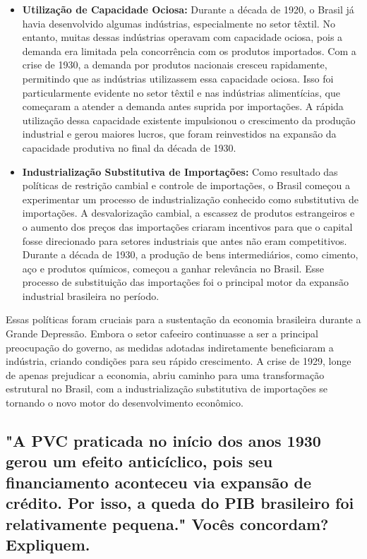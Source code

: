 \documentclass[a4paper,12pt]{article}[abntex2]
\begin{document}
\begin{itemize}
    \item \textbf{Utilização de Capacidade Ociosa:}
    Durante a década de 1920, o Brasil já havia desenvolvido algumas indústrias, especialmente no setor têxtil. No entanto, muitas dessas indústrias operavam com capacidade ociosa, pois a demanda era limitada pela concorrência com os produtos importados. Com a crise de 1930, a demanda por produtos nacionais cresceu rapidamente, permitindo que as indústrias utilizassem essa capacidade ociosa. Isso foi particularmente evidente no setor têxtil e nas indústrias alimentícias, que começaram a atender a demanda antes suprida por importações. A rápida utilização dessa capacidade existente impulsionou o crescimento da produção industrial e gerou maiores lucros, que foram reinvestidos na expansão da capacidade produtiva no final da década de 1930.

    \item \textbf{Industrialização Substitutiva de Importações:}
    Como resultado das políticas de restrição cambial e controle de importações, o Brasil começou a experimentar um processo de industrialização conhecido como substitutiva de importações. A desvalorização cambial, a escassez de produtos estrangeiros e o aumento dos preços das importações criaram incentivos para que o capital fosse direcionado para setores industriais que antes não eram competitivos. Durante a década de 1930, a produção de bens intermediários, como cimento, aço e produtos químicos, começou a ganhar relevância no Brasil. Esse processo de substituição das importações foi o principal motor da expansão industrial brasileira no período.
\end{itemize}

Essas políticas foram cruciais para a sustentação da economia brasileira durante a Grande Depressão. Embora o setor cafeeiro continuasse a ser a principal preocupação do governo, as medidas adotadas indiretamente beneficiaram a indústria, criando condições para seu rápido crescimento. A crise de 1929, longe de apenas prejudicar a economia, abriu caminho para uma transformação estrutural no Brasil, com a industrialização substitutiva de importações se tornando o novo motor do desenvolvimento econômico.

\subsection{\textbf{"A PVC praticada no início dos anos 1930 gerou um efeito anticíclico, pois seu financiamento aconteceu via expansão de crédito. Por isso, a queda do PIB brasileiro foi relativamente pequena." Vocês concordam? Expliquem.}}
\end{document}
